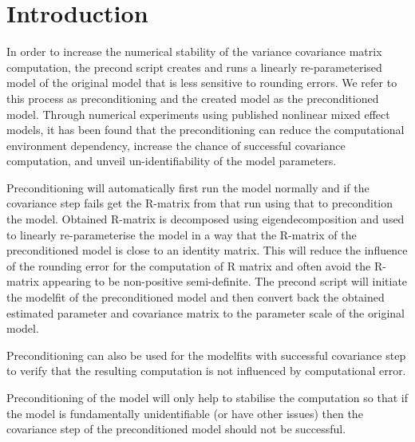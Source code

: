 
\usepackage{color}
\usepackage{amsmath}
\usepackage{tikz}
\usetikzlibrary{shapes,arrows}




\maketitle

\section{Introduction}

In order to increase the numerical stability of the variance covariance matrix computation, the precond script creates and runs a linearly re-parameterised model of the original model that is less sensitive to rounding errors.  We refer to this process as preconditioning and the created model as the preconditioned model.  Through numerical experiments\cite{Page} using published nonlinear mixed effect models, it has been found that the preconditioning can reduce the computational environment dependency, increase the chance of successful covariance computation, and unveil un-identifiability of the model parameters.

Preconditioning will automatically first run the model normally and if the covariance step fails get the R-matrix from that run using that to precondition the model. Obtained R-matrix is decomposed using eigendecomposition and used to linearly re-parameterise the model in a way that the R-matrix of the preconditioned model is close to an identity matrix.  This will reduce the influence of the rounding error for the computation of R matrix and often avoid the R-matrix appearing to be non-positive semi-definite.  The precond script will initiate the modelfit of the preconditioned model and then convert back the obtained estimated parameter and covariance matrix to the parameter scale of the original model.

Preconditioning can also be used for the modelfits with successful covariance step to verify that the resulting computation is not influenced by computational error.

Preconditioning of the model will only help to stabilise the computation so that if the model is fundamentally unidentifiable (or have other issues) then the covariance step of the preconditioned model should not be successful.\\



